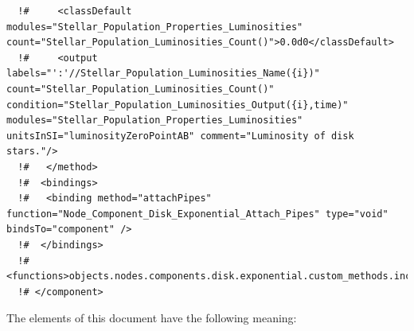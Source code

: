 \begin{verbatim}
  !#     <classDefault modules="Stellar_Population_Properties_Luminosities" count="Stellar_Population_Luminosities_Count()">0.0d0</classDefault>
  !#     <output labels="':'//Stellar_Population_Luminosities_Name({i})" count="Stellar_Population_Luminosities_Count()" condition="Stellar_Population_Luminosities_Output({i},time)" modules="Stellar_Population_Properties_Luminosities" unitsInSI="luminosityZeroPointAB" comment="Luminosity of disk stars."/>
  !#   </method>
  !#  <bindings>
  !#   <binding method="attachPipes" function="Node_Component_Disk_Exponential_Attach_Pipes" type="void" bindsTo="component" />
  !#  </bindings>
  !#  <functions>objects.nodes.components.disk.exponential.custom_methods.inc</functions>
  !# </component>
\end{verbatim}

The elements of this document have the following meaning:
